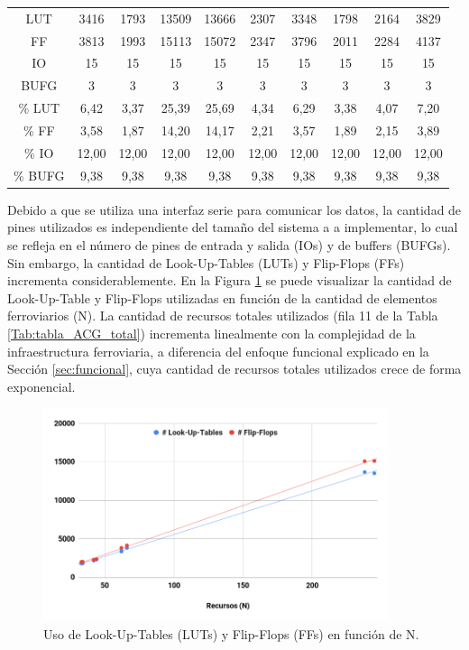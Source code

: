 \begin{table}[H]
{\begin{center}
{\begin{tabular}{ c c c c c c c c c c  }
						LUT 			& 3416  & 1793  & 13509 & 13666 & 2307  & 3348  & 1798  & 2164  & 3829\\
						FF 				& 3813  & 1993  & 15113 & 15072 & 2347  & 3796  & 2011  & 2284  & 4137\\
						IO 				& 15    & 15    & 15    & 15    & 15    & 15    & 15    & 15    & 15\\
						BUFG 			& 3     & 3     & 3     & 3     & 3     & 3     & 3     & 3     & 3\\
						\hline
						\% LUT 			& 6,42  & 3,37  & 25,39 & 25,69 & 4,34  & 6,29  & 3,38  & 4,07  & 7,20\\
						\% FF 			& 3,58  & 1,87  & 14,20 & 14,17 & 2,21  & 3,57  & 1,89  & 2,15  & 3,89\\
						\% IO 			& 12,00 & 12,00 & 12,00 & 12,00 & 12,00 & 12,00 & 12,00 & 12,00 & 12,00\\
						\% BUFG 		& 9,38  & 9,38  & 9,38  & 9,38  & 9,38  & 9,38  & 9,38  & 9,38  & 9,38\\
					\end{tabular}
				}
			\end{center}
		}    
	\end{table}
	
	Debido a que se utiliza una interfaz serie para comunicar los datos, la cantidad de pines utilizados es independiente del tamaño del sistema a a implementar, lo cual se refleja en el número de pines de entrada y salida (IOs) y de buffers (BUFGs). Sin embargo, la cantidad de Look-Up-Tables (LUTs) y Flip-Flops (FFs) incrementa considerablemente. En la Figura \ref{fig:ACG_RECURSOS_1} se puede visualizar la cantidad de Look-Up-Table y Flip-Flops utilizadas en función de la cantidad de elementos ferroviarios (N). La cantidad de recursos totales utilizados (fila 11 de la Tabla \ref{Tab:tabla_ACG_total}) incrementa linealmente con la complejidad de la infraestructura ferroviaria, a diferencia del enfoque funcional explicado en la Sección \ref{sec:funcional}, cuya cantidad de recursos totales utilizados crece de forma exponencial.	
	 	
	\begin{figure}[H]
		\centering
		\includegraphics[origin = c, width=0.9\textwidth]{resultados-obtenidos/ejemplo1/images/recursos_1}
		\centering\caption{Uso de Look-Up-Tables (LUTs) y Flip-Flops (FFs) en función de N.}
		\label{fig:ACG_RECURSOS_1}
	\end{figure}
	
